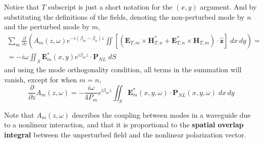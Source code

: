 Notice that $T$ subscript is just a short notation for the $(x,y)$ argument. And by substituting the definitions of the fields, denoting the non-perturbed mode by $n$ and the perturbed mode by $m$, 
\begin{multline}
    \sum_m\frac{\partial}{\partial z}\left(A_m(z,\omega)e^{-i(\beta_m-\beta_n)z}\iint\left[\left(\textbf{E}_{T,m}\times\textbf{H}^*_{T,n}+\textbf{E}^*_{T,n}\times\textbf{H}_{T,m}\right)\cdot\hat{\textbf{z}}\right]\;dx\,dy\right)=\\=-i\omega\iint_S\textbf{E}_{m}^*(x,y)e^{i\beta_mz}\cdot\textbf{P}_{NL}\;dS
\end{multline}
and using the mode orthogonality condition, all terms in the summation will vanish, except for when $m=n$,
\begin{equation}
    \boxed{\frac{\partial}{\partial z} A_m(z,\omega)=-\frac{i\omega}{4P_m}e^{i\beta_mz}\iint_S\textbf{E}_{m}^*(x,y,\omega)\cdot\textbf{P}_{NL}(x,y,\omega)\;dx\,dy}
    \label{eq:overlap integral}
\end{equation}

Note that $A_m(z,\omega)$ describes the coupling between modes in a waveguide due to a nonlinear interaction, and that it is proportional to the \textbf{spatial overlap integral} between the unperturbed field and the nonlinear polarization vector.






